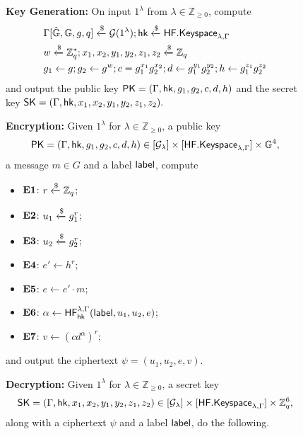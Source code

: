 	\begin{figure}[tbp]
	\begin{framed}\small
		\textbf{Key Generation:} On input $1^\lambda$ from $\lambda\in\mathbb{Z}_{\geq 0}$, compute
		\begin{align*}
			&\Gamma[\hat{\mathbb{G}}, \mathbb{G}, g, q]\xleftarrow{\$}\mathcal{G}(1^\lambda); \mathsf{hk}\xleftarrow{\$}\mathsf{HF.Keyspace}_{\lambda,\Gamma}\\
			&w\xleftarrow{\$}\mathbb{Z}_q^{*}; x_1,x_2,y_1,y_2,z_1,z_2\xleftarrow{\$}\mathbb{Z}_q\\
			&g_1\gets g; g_2\gets g^{w}; c = g_1^{x_1}g_2^{x_2}; d\gets g_1^{y_1}g_2^{y_2}; h\gets g_1^{z_1}g_2^{z_2}
		\end{align*}
		and output the public key $\mathsf{PK} = (\Gamma,\mathsf{hk},g_1,g_2,c,d,h)$ and the secret key $\mathsf{SK} = (\Gamma, \mathsf{hk}, x_1,x_2,y_1,y_2,z_1,z_2).$
		
		\vspace{4mm}
		
		\textbf{Encryption:} Given $1^\lambda$ for $\lambda\in\mathbb{Z}_{\geq 0}$, a public key $$\mathsf{PK}=(\Gamma,\mathsf{hk},g_1,g_2,c,d,h)\in[\mathcal{G}_\lambda]\times[\mathsf{HF.Keyspace}_{\lambda,\Gamma}]\times\mathbb{G}^4,$$ a message $m\in G$ and a label $\mathsf{label}$, compute
		
		\begin{itemize}
			\itemsep=0em
			\item[]\textbf{$\mathbf{E1}$}: $r\xleftarrow{\$}\mathbb{Z}_q$;
			\item[]\textbf{$\mathbf{E2}$}: $u_1\xleftarrow{\$} g_1^r$;
			\item[]\textbf{$\mathbf{E3}$}: $u_2\xleftarrow{\$} g_2^r$;
			\item[]\textbf{$\mathbf{E4}$}: $e'\gets h^r$;
			\item[]\textbf{$\mathbf{E5}$}: $e\gets e'\cdot m$;
			\item[]\textbf{$\mathbf{E6}$}: $\alpha\gets\mathsf{HF}^{\lambda,\Gamma}_{\mathsf{hk}}(\mathsf{label}, u_1, u_2, e)$;
			\item[]\textbf{$\mathbf{E7}$}: $v\gets (cd^\alpha)^r$;
		\end{itemize}
		and output the ciphertext $\psi = (u_1, u_2, e, v)$.
		
		\vspace{4mm}
		
		\textbf{Decryption:} Given $1^\lambda$ for $\lambda\in\mathbb{Z}_{\geq 0}$, a secret key $$\mathsf{SK}=(\Gamma, \mathsf{hk}, x_1,x_2,y_1,y_2,z_1,z_2)\in[\mathcal{G}_\lambda]\times[\mathsf{HF.Keyspace}_{\lambda,\Gamma}]\times\mathbb{Z}_q^{6},$$
		along with a ciphertext $\psi$ and a label $\mathsf{label}$, do the following.
		

\end{framed}
\end{figure}
